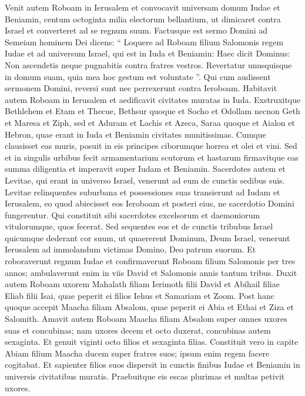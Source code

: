 \begin{biblechapter}
\begin{biblechapter}
\begin{biblechapter}
\begin{biblechapter}
\begin{biblechapter}
\begin{biblechapter}
\begin{biblechapter}
\begin{biblechapter}
\begin{biblechapter}
\begin{biblechapter}
\begin{biblechapter}
\verse Venit autem Roboam in Ierusalem et convocavit universam domum Iudae et Beniamin, centum octoginta milia electorum bellantium, ut dimicaret contra Israel et converteret ad se regnum suum. 
\verse Factusque est sermo Domini ad Semeiam hominem Dei dicens: 
\verse “ Loquere ad Roboam filium Salomonis regem Iudae et ad universum Israel, qui est in Iuda et Beniamin: 
\verse Haec dicit Dominus: Non ascendetis neque pugnabitis contra fratres vestros. Revertatur unusquisque in domum suam, quia mea hoc gestum est voluntate ”. Qui cum audissent sermonem Domini, reversi sunt nec perrexerunt contra Ieroboam.
 \verse Habitavit autem Roboam in Ierusalem et aedificavit civitates muratas in Iuda. 
\verse Exstruxitque Bethlehem et Etam et Thecue, 
\verse Bethsur quoque et Socho et Odollam 
\verse necnon Geth et Maresa et Ziph, 
\verse sed et Aduram et Lachis et Azeca, 
 \verse Saraa quoque et Aialon et Hebron, quae erant in Iuda et Beniamin civitates munitissimas.
 \verse Cumque clausisset eas muris, posuit in eis principes ciborumque horrea et olei et vini. 
\verse Sed et in singulis urbibus fecit armamentarium scutorum et hastarum firmavitque eas summa diligentia et imperavit super Iudam et Beniamin.
 \verse Sacerdotes autem et Levitae, qui erant in universo Israel, venerunt ad eum de cunctis sedibus suis. 
\verse Levitae relinquentes suburbana et possessiones suas transierunt ad Iudam et Ierusalem, eo quod abiecisset eos Ieroboam et posteri eius, ne sacerdotio Domini fungerentur. 
\verse Qui constituit sibi sacerdotes excelsorum et daemoniorum vitulorumque, quos fecerat. 
\verse Sed sequentes eos et de cunctis tribubus Israel quicumque dederant cor suum, ut quaererent Dominum, Deum Israel, venerunt Ierusalem ad immolandum victimas Domino, Deo patrum suorum. 
\verse Et roboraverunt regnum Iudae et confirmaverunt Roboam filium Salomonis per tres annos; ambulaverunt enim in viis David et Salomonis annis tantum tribus.
 \verse Duxit autem Roboam uxorem Mahalath filiam Ierimoth filii David et Abihail filiae Eliab filii Isai, 
\verse quae peperit ei filios Iehus et Samariam et Zoom. 
\verse Post hanc quoque accepit Maacha filiam Absalom, quae peperit ei Abia et Ethai et Ziza et Salomith. 
\verse Amavit autem Roboam Maacha filiam Absalom super omnes uxores suas et concubinas; nam uxores decem et octo duxerat, concubinas autem sexaginta. Et genuit viginti octo filios et sexaginta filias. 
 \verse Constituit vero in capite Abiam filium Maacha ducem super fratres suos; ipsum enim regem facere cogitabat. 
\verse Et sapienter filios suos dispersit in cunctis finibus Iudae et Beniamin in universis civitatibus muratis. Praebuitque eis escas plurimas et multas petivit uxores.
 

\end{biblechapter}
\end{biblechapter}
\end{biblechapter}
\end{biblechapter}
\end{biblechapter}
\end{biblechapter}
\end{biblechapter}
\end{biblechapter}
\end{biblechapter}
\end{biblechapter}
\end{biblechapter}
